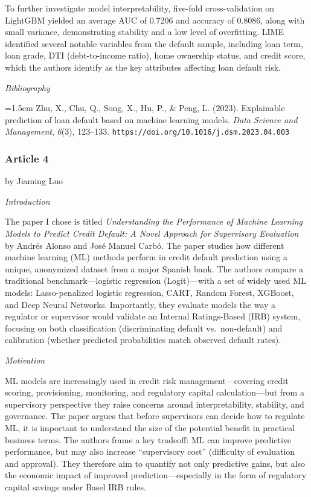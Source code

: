 \documentclass[letterpaper]{article}
\begin{document}
		To further investigate model interpretability, five-fold cross-validation on LightGBM yielded an average AUC of 0.7206 and accuracy of 0.8086, along with small variance, demonstrating stability and a low level of overfitting. LIME identified several notable variables from the default sample, including loan term, loan grade, DTI (debt-to-income ratio), home ownership status, and credit score, which the authors identify as the key attributes affecting loan default risk.
		
		\medskip
		
		\textit{Bibliography}
		
		\hangindent=1.5em
		Zhu, X., Chu, Q., Song, X., Hu, P., \& Peng, L. (2023). Explainable prediction of loan default based on machine learning models. \textit{Data Science and Management}, \textit{6}(3), 123--133. \texttt{https://doi.org/10.1016/j.dsm.2023.04.003}
		
		
		\subsubsection{Article 4}
		
		{\color{deepred} by Jiaming Luo}
		
		
		\textit{Introduction}
		
		The paper I chose is titled \textit{Understanding the Performance of Machine Learning Models to Predict Credit Default: A Novel Approach for Supervisory Evaluation} by Andr\'{e}s Alonso and Jos\'{e} Manuel Carb\'{o}. The paper studies how different machine learning (ML) methods perform in credit default prediction using a unique, anonymized dataset from a major Spanish bank. The authors compare a traditional benchmark---logistic regression (Logit)---with a set of widely used ML models: Lasso-penalized logistic regression, CART, Random Forest, XGBoost, and Deep Neural Networks. Importantly, they evaluate models the way a regulator or supervisor would validate an Internal Ratings-Based (IRB) system, focusing on both classification (discriminating default vs.\ non-default) and calibration (whether predicted probabilities match observed default rates).
		
		\medskip
		
		\textit{Motivation}
		
		ML models are increasingly used in credit risk management---covering credit scoring, provisioning, monitoring, and regulatory capital calculation---but from a supervisory perspective they raise concerns around interpretability, stability, and governance. The paper argues that before supervisors can decide how to regulate ML, it is important to understand the size of the potential benefit in practical business terms. The authors frame a key tradeoff: ML can improve predictive performance, but may also increase ``supervisory cost'' (difficulty of evaluation and approval). They therefore aim to quantify not only predictive gains, but also the economic impact of improved prediction---especially in the form of regulatory capital savings under Basel IRB rules.
		
\end{document}
